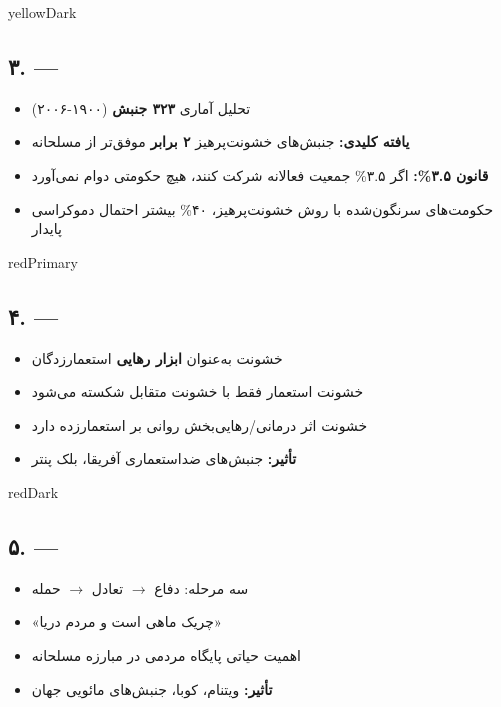 \documentclass[a4paper,12pt]{article}
\begin{document}
\begin{theorycard}{yellowDark}
\subsection*{\textcolor{yellowDark}{\faBook} ۳.  — }

\begin{itemize}[label=\textcolor{yellowDark}{$\bullet$}]
  \item تحلیل آماری \textbf{۳۲۳ جنبش} (۱۹۰۰-۲۰۰۶)
  \item \textbf{یافته کلیدی:} جنبش‌های خشونت‌پرهیز \textbf{۲ برابر} موفق‌تر از مسلحانه
  \item \textbf{قانون ۳.۵\%:} اگر ۳.۵\% جمعیت فعالانه شرکت کنند، هیچ حکومتی دوام نمی‌آورد
  \item حکومت‌های سرنگون‌شده با روش خشونت‌پرهیز، ۴۰\% بیشتر احتمال دموکراسی پایدار
\end{itemize}
\end{theorycard}

\begin{theorycard}{redPrimary}
\subsection*{\textcolor{redPrimary}{\faBook} ۴.  — }

\begin{itemize}[label=\textcolor{redPrimary}{$\bullet$}]
  \item خشونت به‌عنوان \textbf{ابزار رهایی} استعمارزدگان
  \item خشونت استعمار فقط با خشونت متقابل شکسته می‌شود
  \item خشونت اثر درمانی/رهایی‌بخش روانی بر استعمارزده دارد
  \item \textbf{تأثیر:} جنبش‌های ضداستعماری آفریقا، بلک پنتر
\end{itemize}
\end{theorycard}

\begin{theorycard}{redDark}
\subsection*{\textcolor{redDark}{\faBook} ۵.  —  }

\begin{itemize}[label=\textcolor{redDark}{$\bullet$}]
  \item سه مرحله: دفاع $\rightarrow$ تعادل $\rightarrow$ حمله
  \item «چریک ماهی است و مردم دریا»
  \item اهمیت حیاتی پایگاه مردمی در مبارزه مسلحانه
  \item \textbf{تأثیر:} ویتنام، کوبا، جنبش‌های مائویی جهان
\end{itemize}
\end{theorycard}
\end{document}
